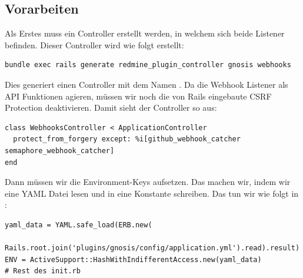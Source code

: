 \subsection{Vorarbeiten}
\label{sec:webhook_prework}
Als Erstes muss ein Controller erstellt werden, in welchem sich beide Listener befinden. Dieser Controller wird wie
folgt erstellt:
\begin{codebox}[]
  \begin{verbatim}
bundle exec rails generate redmine_plugin_controller gnosis webhooks
  \end{verbatim}
\end{codebox}

Dies generiert einen Controller mit dem Namen . Da die Webhook Listener als
API Funktionen agieren, müssen wir noch die von Rails eingebaute CSRF Protection deaktivieren. Damit sieht der
Controller so aus:
\begin{codebox}[]
  \begin{verbatim}
class WebhooksController < ApplicationController
  protect_from_forgery except: %i[github_webhook_catcher semaphore_webhook_catcher]
end
  \end{verbatim}
\end{codebox}

Dann müssen wir die Environment-Keys aufsetzen. Das machen wir, indem wir eine YAML Datei lesen und in eine Konstante
schreiben. Das tun wir wie folgt in :
\begin{codebox}[]
  \begin{verbatim}
yaml_data = YAML.safe_load(ERB.new(
  Rails.root.join('plugins/gnosis/config/application.yml').read).result)
ENV = ActiveSupport::HashWithIndifferentAccess.new(yaml_data)
# Rest des init.rb
  \end{verbatim}
\end{codebox}

